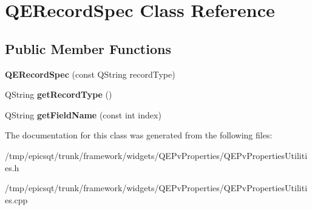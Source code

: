 \hypertarget{classQERecordSpec}{
\section{QERecordSpec Class Reference}
\label{classQERecordSpec}
}
\subsection*{Public Member Functions}
\begin{DoxyCompactItemize}
\item 
\hypertarget{classQERecordSpec_a576aa6cc58cf1266d166733d258df906}{
{\bfseries QERecordSpec} (const QString recordType)}
\label{classQERecordSpec_a576aa6cc58cf1266d166733d258df906}

\item 
\hypertarget{classQERecordSpec_ab098717610b6e4aa8c5c6f4efee12b17}{
QString {\bfseries getRecordType} ()}
\label{classQERecordSpec_ab098717610b6e4aa8c5c6f4efee12b17}

\item 
\hypertarget{classQERecordSpec_a13ecd8d131004228c6726392dc908f84}{
QString {\bfseries getFieldName} (const int index)}
\label{classQERecordSpec_a13ecd8d131004228c6726392dc908f84}

\end{DoxyCompactItemize}


The documentation for this class was generated from the following files:\begin{DoxyCompactItemize}
\item 
/tmp/epicsqt/trunk/framework/widgets/QEPvProperties/QEPvPropertiesUtilities.h\item 
/tmp/epicsqt/trunk/framework/widgets/QEPvProperties/QEPvPropertiesUtilities.cpp\end{DoxyCompactItemize}
